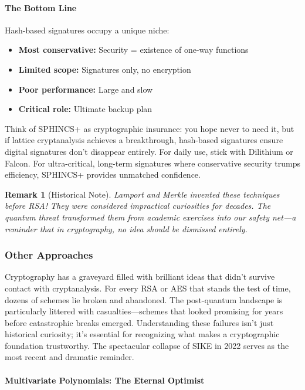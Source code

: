 \documentclass[11pt,a4paper]{article}
\newtheorem{remark}{Remark}
\begin{document}
\paragraph{The Bottom Line}

Hash-based signatures occupy a unique niche:
\begin{itemize}
    \item \textbf{Most conservative:} Security = existence of one-way functions
    \item \textbf{Limited scope:} Signatures only, no encryption
    \item \textbf{Poor performance:} Large and slow
    \item \textbf{Critical role:} Ultimate backup plan
\end{itemize}

Think of SPHINCS+ as cryptographic insurance: you hope never to need it, but if lattice cryptanalysis achieves a breakthrough, hash-based signatures ensure digital signatures don't disappear entirely. For daily use, stick with Dilithium or Falcon. For ultra-critical, long-term signatures where conservative security trumps efficiency, SPHINCS+ provides unmatched confidence.

\begin{remark}[Historical Note]
Lamport and Merkle invented these techniques before RSA! They were considered impractical curiosities for decades. The quantum threat transformed them from academic exercises into our safety net—a reminder that in cryptography, no idea should be dismissed entirely.
\end{remark}

\subsubsection{Other Approaches}

Cryptography has a graveyard filled with brilliant ideas that didn't survive contact with cryptanalysis. For every RSA or AES that stands the test of time, dozens of schemes lie broken and abandoned. The post-quantum landscape is particularly littered with casualties—schemes that looked promising for years before catastrophic breaks emerged. Understanding these failures isn't just historical curiosity; it's essential for recognizing what makes a cryptographic foundation trustworthy. The spectacular collapse of SIKE in 2022 serves as the most recent and dramatic reminder.

\paragraph{Multivariate Polynomials: The Eternal Optimist}
\end{document}
